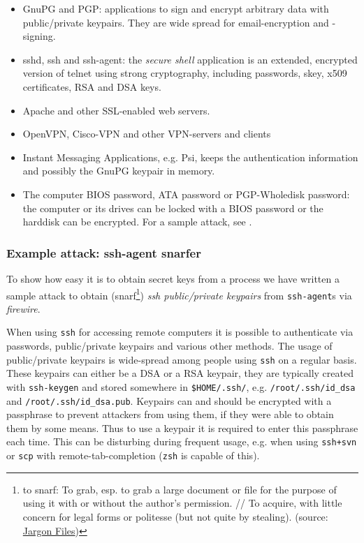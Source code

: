 \begin{itemize}

	\item GnuPG and PGP: applications to sign and encrypt arbitrary data
	with public/private keypairs. They are wide spread for email-encryption
	and -signing.

	\item sshd, ssh and ssh-agent: the \emph{secure shell} application is an
	extended, encrypted version of telnet using strong cryptography,
	including passwords, skey, x509 certificates, RSA and DSA keys.

	\item Apache and other SSL-enabled web servers.

	\item OpenVPN, Cisco-VPN and other VPN-servers and clients

	\item Instant Messaging Applications, e.g\@. Psi, keeps the
		authentication information and possibly the GnuPG keypair in
		memory.

	\item The computer BIOS password, ATA password or PGP-Wholedisk
		password: the computer or its drives can be locked with a BIOS
		password or the harddisk can be encrypted.  For a sample attack,
		see \cite{rux2k6firewire:2006}.

\end{itemize}


\subsubsection{Example attack: ssh-agent snarfer}

\label{ssh-agent-snarfer} To show how easy it is to obtain secret keys from a
process we have written a sample attack to obtain
%
(snarf\footnote{to snarf: To grab, esp. to grab a large document or file for the
purpose of using it with or without the author's permission. // To acquire, with
little concern for legal forms or politesse (but not quite by stealing).
(source: \href{http://catb.org/jargon/html/S/snarf.html}{Jargon Files})})
%
\emph{ssh public/private keypairs} from \texttt{ssh-agent}s via \emph{firewire}.

When using \texttt{ssh} for accessing remote computers it is possible to
authenticate via passwords, public/private keypairs and various other methods.
The usage of public/private keypairs is wide-spread among people using
\texttt{ssh} on a regular basis. These keypairs can either be a DSA or a RSA
keypair, they are typically created with \texttt{ssh-keygen} and stored
somewhere in \texttt{\$HOME/.ssh/}, e.g\@. \texttt{/root/.ssh/id\_dsa} and
\texttt{/root/.ssh/id\_dsa.pub}. Keypairs can and should be encrypted with a
passphrase to prevent attackers from using them, if they were able to obtain
them by some means. Thus to use a keypair it is required to enter this
passphrase each time.  This can be disturbing during frequent usage, e.g\@. when
using \texttt{ssh+svn} or \texttt{scp} with remote-tab-completion (\texttt{zsh}
is capable of this).

